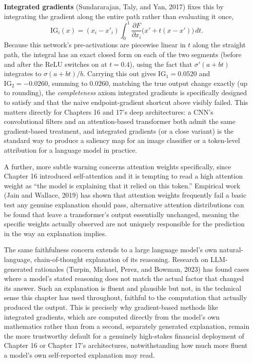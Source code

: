 \documentclass[../ai_in_finance]{subfiles}
\begin{document}
\textbf{Integrated gradients} (Sundararajan, Taly, and Yan, 2017) fixes this by integrating the gradient along the entire path rather
than evaluating it once,
$$\text{IG}_i(x) = (x_i - x'_i) \int_0^1 \frac{\partial F}{\partial x_i}\big(x' + t(x - x')\big)\, dt.$$
Because this network's pre-activations are piecewise linear in $t$ along the straight path, the integral has an exact closed form on each of the
two segments (before and after the ReLU switches on at $t=0.4$), using the fact that
$\sigma'(a+bt)$ integrates to $\sigma(a+bt)/b$.
 Carrying this out gives
 $\text{IG}_1 = 0.0520$ and $\text{IG}_2 = -0.0260$,
 summing to $0.0260$, matching the true output change exactly (up to rounding), the \emph{completeness} axiom integrated gradients is specifically designed to satisfy and that the naive endpoint-gradient shortcut above visibly failed. This matters directly for Chapters 16 and 17's deep architectures: a CNN's convolutional filters and an attention-based transformer both admit the same gradient-based treatment, and integrated gradients (or a close variant) is the standard way to produce a saliency map for an image classifier or a token-level attribution for a language model in practice.

A further, more subtle warning concerns attention weights specifically, since Chapter 16 introduced self-attention and it is tempting to read a high attention weight as ``the model is explaining that it relied on this token.'' Empirical work (Jain and Wallace, 2019) has shown that attention weights frequently fail a basic test any genuine explanation should pass, alternative attention distributions can be found that leave a transformer's output essentially unchanged, meaning the specific weights actually observed are not uniquely responsible for the prediction in the way an explanation implies.

The same faithfulness concern extends to a large language model's own natural-language, chain-of-thought explanation of its reasoning. Research on LLM-generated rationales (Turpin, Michael, Perez, and Bowman, 2023) has found cases where a model's stated reasoning does not match the actual factor that changed its answer. Such an explanation is fluent and plausible but not, in the technical sense this chapter has used throughout, faithful to the computation that actually produced the output. This is precisely why gradient-based methods like integrated gradients, which are computed directly from the model's own mathematics rather than from a second, separately generated explanation, remain the more trustworthy default for a genuinely high-stakes financial deployment of Chapter 16 or Chapter 17's architectures, notwithstanding how much more fluent a model's own self-reported explanation may read.
\end{document}
